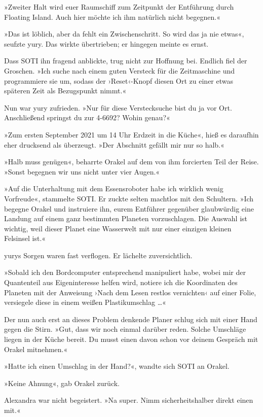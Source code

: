 »Zweiter Halt wird euer Raumschiff zum Zeitpunkt der Entführung durch Floating Island. Auch hier möchte ich ihm natürlich nicht begegnen.«

»Das ist löblich, aber da fehlt ein Zwischenschritt. So wird das ja nie etwas«, seufzte yury. Das wirkte übertrieben; er hingegen meinte es ernst.

Dass SOTI ihn fragend anblickte, trug nicht zur Hoffnung bei. Endlich fiel der Groschen. »Ich suche nach einem guten Versteck für die Zeitmaschine und programmiere sie um, sodass der ›Reset‹-Knopf diesen Ort zu einer etwas späteren Zeit als Bezugspunkt nimmt.«

Nun war yury zufrieden. »Nur für diese Verstecksuche bist du ja vor Ort. Anschließend springst du zur 4-6692? Wohin genau?«

»Zum ersten September 2021 um 14 Uhr Erdzeit in die Küche«, hieß es daraufhin eher drucksend als überzeugt. »Der Abschnitt gefällt mir nur so halb.«

»Halb muss genügen«, beharrte Orakel auf dem von ihm forcierten Teil der Reise. »Sonst begegnen wir uns nicht unter vier Augen.«

»Auf die Unterhaltung mit dem Essensroboter habe ich wirklich wenig Vorfreude«, stammelte SOTI. Er zuckte selten machtlos mit den Schultern. »Ich begegne Orakel und instruiere ihn, eurem Entführer gegenüber glaubwürdig eine Landung auf einem ganz bestimmten Planeten vorzuschlagen. Die Auswahl ist wichtig, weil dieser Planet eine Wasserwelt mit nur einer einzigen kleinen Felsinsel ist.«

yurys Sorgen waren fast verflogen. Er lächelte zuversichtlich.

»Sobald ich den Bordcomputer entsprechend manipuliert habe, wobei mir der Quantenteil aus Eigeninteresse helfen wird, notiere ich die Koordinaten des Planeten mit der Anweisung ›Nach dem Lesen restlos vernichten‹ auf einer Folie, versiegele diese in einem weißen Plastikumschlag …«

Der nun auch erst an dieses Problem denkende Planer schlug sich mit einer Hand gegen die Stirn. »Gut, dass wir noch einmal darüber reden. Solche Umschläge liegen in der Küche bereit. Du musst einen davon schon vor deinem Gespräch mit Orakel mitnehmen.«

»Hatte ich einen Umschlag in der Hand?«, wandte sich SOTI an Orakel.

»Keine Ahnung«, gab Orakel zurück.

Alexandra war nicht begeistert. »Na super. Nimm sicherheitshalber direkt einen mit.«

